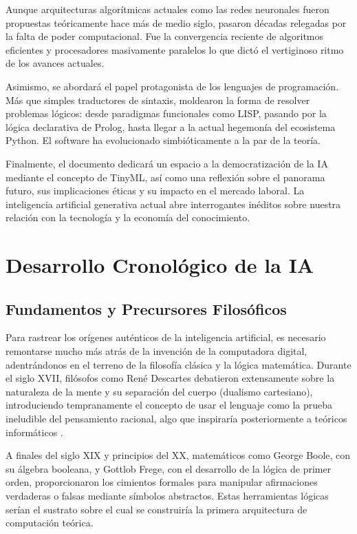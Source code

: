 \documentclass[12pt,letterpaper]{article}
\begin{document}
Aunque arquitecturas algorítmicas actuales como las redes neuronales fueron propuestas teóricamente hace más de medio siglo, pasaron décadas relegadas por la falta de poder computacional. Fue la convergencia reciente de algoritmos eficientes y procesadores masivamente paralelos lo que dictó el vertiginoso ritmo de los avances actuales.

Asimismo, se abordará el papel protagonista de los lenguajes de programación. Más que simples traductores de sintaxis, moldearon la forma de resolver problemas lógicos: desde paradigmas funcionales como LISP, pasando por la lógica declarativa de Prolog, hasta llegar a la actual hegemonía del ecosistema Python. El software ha evolucionado simbióticamente a la par de la teoría.

Finalmente, el documento dedicará un espacio a la democratización de la IA mediante el concepto de TinyML, así como una reflexión sobre el panorama futuro, sus implicaciones éticas y su impacto en el mercado laboral. La inteligencia artificial generativa actual abre interrogantes inéditos sobre nuestra relación con la tecnología y la economía del conocimiento.
\newpage
\section{Desarrollo Cronológico de la IA}

\subsection{Fundamentos y Precursores Filosóficos}
Para rastrear los orígenes auténticos de la inteligencia artificial, es necesario remontarse mucho más atrás de la invención de la computadora digital, adentrándonos en el terreno de la filosofía clásica y la lógica matemática. Durante el siglo XVII, filósofos como René Descartes debatieron extensamente sobre la naturaleza de la mente y su separación del cuerpo (dualismo cartesiano), introduciendo tempranamente el concepto de usar el lenguaje como la prueba ineludible del pensamiento racional, algo que inspiraría posteriormente a teóricos informáticos \citep{abramson2011descartes}.

A finales del siglo XIX y principios del XX, matemáticos como George Boole, con su álgebra booleana, y Gottlob Frege, con el desarrollo de la lógica de primer orden, proporcionaron los cimientos formales para manipular afirmaciones verdaderas o falsas mediante símbolos abstractos. Estas herramientas lógicas serían el sustrato sobre el cual se construiría la primera arquitectura de computación teórica.
\end{document}
